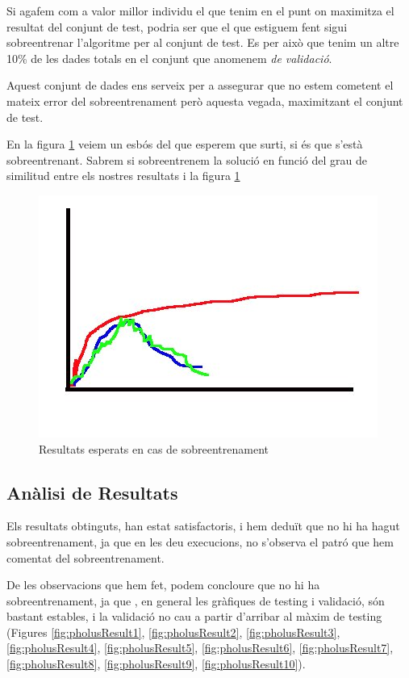 Si agafem com a valor millor individu el que tenim en el punt on maximitza el
resultat del conjunt de test, podria ser que el que estiguem fent sigui
sobreentrenar l'algoritme per al conjunt de test.  Es per això que tenim un
altre 10\% de les dades totals en el conjunt que anomenem \emph{de validació}. 

Aquest conjunt de dades ens serveix per a assegurar que no estem cometent el
mateix error del sobreentrenament però aquesta vegada, maximitzant el conjunt de
test.  

En la figura \ref{fig:sobreent} veiem un esbós del que esperem que surti, si és que s'està
sobreentrenant. Sabrem si sobreentrenem la solució en funció del grau de similitud entre els nostres
resultats i la figura \ref{fig:sobreent}

\begin{figure}[h]
	\begin{center}
		\includegraphics{pholus/sobreentrenament.jpg}
	\end{center}
	\caption{Resultats esperats en cas de sobreentrenament}
	\label{fig:sobreent}
\end{figure}

\subsection{Anàlisi de Resultats} %
\label{sub:Analisi de Resultats}

Els resultats obtinguts, han estat satisfactoris, i hem deduït que no hi ha
hagut sobreentrenament, ja que en les deu execucions, no s'observa el patró que
hem comentat del sobreentrenament.

De les observacions que hem fet, podem concloure que no hi ha sobreentrenament,
ja que , en general les gràfiques de testing i validació, són bastant estables,
i la validació no cau a partir d'arribar al màxim de testing (Figures \ref{fig:pholusResult1},
\ref{fig:pholusResult2}, \ref{fig:pholusResult3}, \ref{fig:pholusResult4}, \ref{fig:pholusResult5},
\ref{fig:pholusResult6}, \ref{fig:pholusResult7}, \ref{fig:pholusResult8}, \ref{fig:pholusResult9},
\ref{fig:pholusResult10}).

